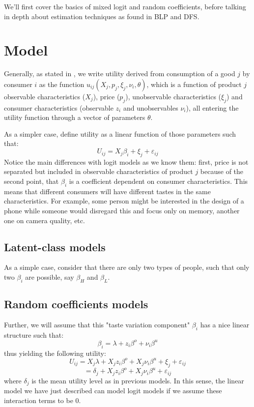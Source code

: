 \documentclass[12pt]{report}
\begin{document}
We'll first cover the basics of mixed logit and random coefficients, before talking in depth about estimation techniques as found in BLP and DFS.

\section{Model}

Generally, as stated in \cite{blp_95}, we write utility derived from consumption of a good $j$ by consumer $i$ as the function $u_{ij}(X_j, p_j, \xi_j, \nu_i, \theta)$, which is a function of product $j$ observable characteristics ($X_j$), price ($p_j$), unobservable characteristics ($\xi_j$) and consumer characteristics (observable $z_i$ and unobservables $\nu_i$), all entering the utility function through a vector of parameters $\theta$. 

As a simpler case, define utility as a linear function of those parameters such that: $$U_{ij} = X_j\beta_i + \xi_j + \varepsilon_{ij} $$ Notice the main differences with logit models as we know them: first, price is not separated but included in observable characteristics of product $j$ because of the second point, that $\beta_i$ is a coefficient dependent on consumer characteristics. This means that different consumers will have different tastes in the same characteristics. For example, some person might be interested in the design of a phone while someone would disregard this and focus only on memory, another one on camera quality, etc.

\subsection{Latent-class models}

As a simple case, consider that there are only two types of people, such that only two $\beta_i$ are possible, say $\beta_H$ and $\beta_L$.



\subsection{Random coefficients models}

Further, we will assume that this "taste variation component" $\beta_i$ has a nice linear structure such that: $$\beta_i = \lambda + z_i\beta^o + \nu_i\beta^u $$ thus yielding the following utility: $$ U_{ij} = X_j\lambda + X_jz_i\beta^o + X_j\nu_i\beta^u + \xi_j + \varepsilon_{ij} $$ $$ = \delta_j + X_jz_i\beta^o + X_j\nu_i\beta^u + \varepsilon_{ij} $$ where $\delta_j$ is the mean utility level as in previous models. In this sense, the linear model we have just described can model logit models if we assume these interaction terms to be 0. 
\end{document}
